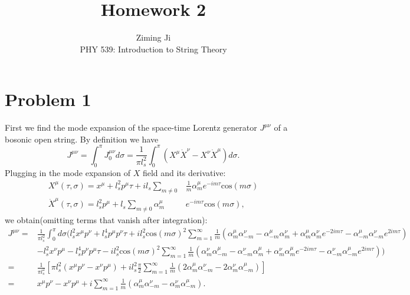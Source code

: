 \documentclass[12pt]{article}
\begin{document}
 
\title{Homework 2}
\author{Ziming Ji\\ 
PHY 539: Introduction to String Theory}
 
\maketitle
 
\section{Problem 1}
First we find the mode expansion of the space-time Lorentz generator $J^{\mu\nu}$ of a bosonic open string. By definition we have 
\begin{equation}
J^{\mu\nu}=\int_{0}^{\pi} J^{\mu\nu}_0 d\sigma = \frac{1}{\pi l_s^2}\int_{0}^{\pi}(X^\mu \dot{X}^\nu-X^\nu \dot{X}^\mu) d\sigma.
\end{equation}
Plugging in the mode expansion of $X$ field and its derivative:
\begin{equation}
\begin{aligned}
X^\mu(\tau,\sigma)=x^\mu+l_s^2 p^\mu \tau+il_s\sum\limits_{m\neq 0}&\frac{1}{m}\alpha^\mu_m e^{-im\tau}\text{cos}(m\sigma)\\
\dot{X}^\mu(\tau,\sigma)=l_s^2 p^\mu+l_s\sum\limits_{m\neq 0}\alpha^\mu_m &e^{-im\tau}\text{cos}(m\sigma),
\end{aligned}
\end{equation}
we obtain(omitting terms that vanish after integration):
\begin{equation}
\begin{aligned}
J^{\mu\nu}=&\frac{1}{\pi l_s^2}\int_{0}^{\pi} d\sigma (l_s^2 x^\mu p^\nu+l_s^4 p^\mu p^\nu \tau+il_s^2\text{cos}(m\sigma)^2\sum\limits_{m=1}^\infty\frac{1}{m}(\alpha_m^\mu \alpha_{-m}^\nu-\alpha_{-m}^\mu \alpha_m^\nu+\alpha_m^\mu \alpha_{m}^\nu e^{-2im\tau}-\alpha_{-m}^\mu \alpha_{-m}^\nu e^{2im\tau})\\
&-l_s^2 x^\nu p^\mu-l_s^4 p^\nu p^\mu \tau-il_s^2\text{cos}(m\sigma)^2\sum\limits_{m=1}^\infty\frac{1}{m}(\alpha_m^\nu \alpha_{-m}^\mu-\alpha_{-m}^\nu \alpha_m^\mu+\alpha_m^\nu \alpha_{m}^\mu e^{-2im\tau}-\alpha_{-m}^\nu \alpha_{-m}^\mu e^{2im\tau}))\\
=&\frac{1}{\pi l_s^2}[\pi l_s^2(x^\mu p^\nu-x^\nu p^\mu)+il_s^2 \frac{\pi}{2}\sum\limits_{m=1}^\infty\frac{1}{m}(2\alpha_m^\mu \alpha_{-m}^\nu-2\alpha_m^\nu \alpha_{-m}^\mu)]\\
=&x^\mu p^\nu-x^\nu p^\mu+i\sum\limits_{m=1}^\infty\frac{1}{m}(\alpha_m^\mu \alpha_{-m}^\nu-\alpha_m^\nu \alpha_{-m}^\mu).
\end{aligned}
\end{equation}
\end{document}
